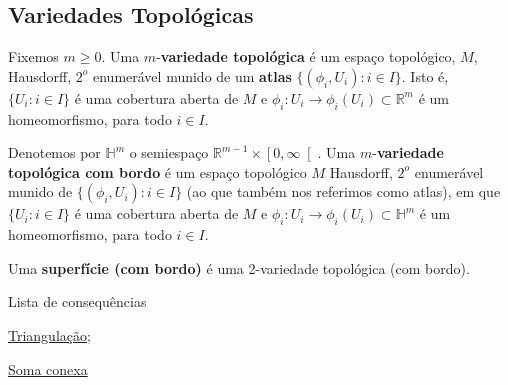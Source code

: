 \subsection{Variedades Topológicas}
\label{variedade-def}
\begin{defi}
	Fixemos $m\geq 0$. Uma $m$-\textbf{variedade topológica} é um espaço topológico, $M$, Hausdorff, $2^o$ enumerável munido de um \textbf{atlas} $\{(\phi_i, U_i) : i \in I\}$. Isto é, $\{U_i : i \in I\}$ é uma cobertura aberta de $M$ e $\phi_i: U_i \to \phi_i(U_i) \subset \mathbb{R}^m$ é um homeomorfismo, para todo $i \in I$.
    
    Denotemos por $\mathbb{H}^m$ o semiespaço $\mathbb{R}^{m-1}\times \left[0,\infty\right[$. Uma $m$-\textbf{variedade topológica com bordo} é um espaço topológico $M$ Hausdorff, $2^o$ enumerável munido de $\{(\phi_i, U_i) : i \in I\}$ (ao que também nos referimos como atlas), em que $\{U_i : i \in I\}$ é uma cobertura aberta de $M$ e $\phi_i: U_i \to \phi_i(U_i) \subset \mathbb{H}^m$ é um homeomorfismo, para todo $i \in I$.

Uma \textbf{superfície (com bordo)} é uma 2-variedade topológica (com bordo).
\end{defi}

\begin{titlemize}{Lista de consequências}
	\item \hyperref[triangulacao-def]{Triangulação};\\
    \item \hyperref[soma-conexa-def]{Soma conexa}
\end{titlemize}

